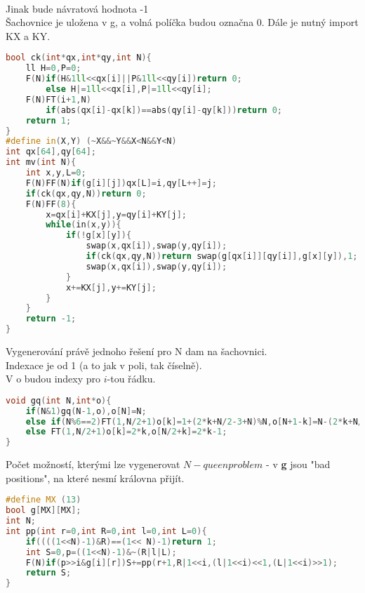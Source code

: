\documentclass[11pt]{article}
\begin{document}
\\Jinak bude návratová hodnota -1
\\Šachovnice je uložena v \textsf{g}, a volná políčka budou označna $0$. Dále je nutný import \textsf{KX} a \textsf{KY}.
\begin{lstlisting}[language=C++]
bool ck(int*qx,int*qy,int N){
    ll H=0,P=0;
    F(N)if(H&1ll<<qx[i]||P&1ll<<qy[i])return 0;
        else H|=1ll<<qx[i],P|=1ll<<qy[i];
    F(N)FT(i+1,N)
        if(abs(qx[i]-qx[k])==abs(qy[i]-qy[k]))return 0;
    return 1;
}
#define in(X,Y) (~X&&~Y&&X<N&&Y<N)
int qx[64],qy[64];
int mv(int N){
    int x,y,L=0;
    F(N)FF(N)if(g[i][j])qx[L]=i,qy[L++]=j;
    if(ck(qx,qy,N))return 0;
    F(N)FF(8){
        x=qx[i]+KX[j],y=qy[i]+KY[j];
        while(in(x,y)){
            if(!g[x][y]){
                swap(x,qx[i]),swap(y,qy[i]);
                if(ck(qx,qy,N))return swap(g[qx[i]][qy[i]],g[x][y]),1;
                swap(x,qx[i]),swap(y,qy[i]);
            }
            x+=KX[j],y+=KY[j];
        }
    }
    return -1;
}
\end{lstlisting}
Vygenerování právě jednoho řešení pro \textsf{N} dam na šachovnici.
\\Indexace je od 1 (a to jak v poli, tak číselně).
\\V \textsf{o} budou indexy pro $i$-tou řádku.
\begin{lstlisting}[language=C++]
void gq(int N,int*o){
    if(N&1)gq(N-1,o),o[N]=N;
    else if(N%6==2)FT(1,N/2+1)o[k]=1+(2*k+N/2-3+N)%N,o[N+1-k]=N-(2*k+N/2-3+N)%N;
    else FT(1,N/2+1)o[k]=2*k,o[N/2+k]=2*k-1;
}
\end{lstlisting}
Počet možností, kterými lze vygenerovat $N-queen problem$ - v \textbf{g} jsou "bad positions", na které nesmí královna přijít. 
\begin{lstlisting}[language=C++]
#define MX (13)
bool g[MX][MX];
int N;
int pp(int r=0,int R=0,int l=0,int L=0){
    if((((1<<N)-1)&R)==(1<< N)-1)return 1;
    int S=0,p=((1<<N)-1)&~(R|l|L);
    F(N)if(p>>i&g[i][r])S+=pp(r+1,R|1<<i,(l|1<<i)<<1,(L|1<<i)>>1);
    return S;
}
\end{lstlisting}
\end{document}

